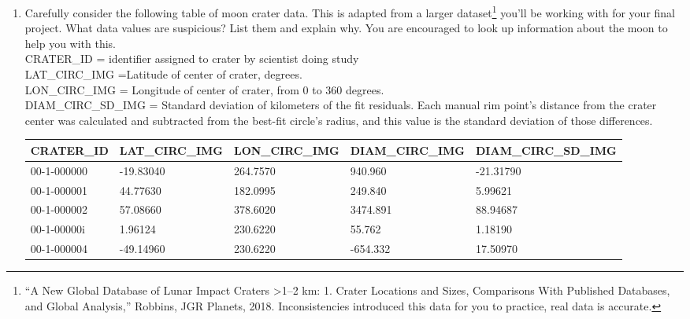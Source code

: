 \documentclass[Assignment5_Solutions]{subfiles}
\begin{document}

\begin{enumerate}[resume]
\item Carefully consider the following table of moon crater data. This is adapted from a larger dataset\footnote{``A New Global Database of Lunar Impact Craters >1–2 km: 1. Crater Locations and Sizes, Comparisons With Published Databases, and Global Analysis,'' Robbins, JGR Planets, 2018. Inconsistencies introduced this data for you to practice, real data is accurate.} you'll be working with for your final project. What data values are suspicious? List them and explain why. You are encouraged to look up information about the moon to help you with this.\\
CRATER\_ID = identifier assigned to crater by scientist doing study\\
LAT\_CIRC\_IMG =Latitude of center of crater, degrees.\\
LON\_CIRC\_IMG = Longitude of center of crater, from 0 to 360 degrees.\\
DIAM\_CIRC\_SD\_IMG = Standard deviation of kilometers of the fit residuals. Each manual
rim point’s distance from the crater center was calculated and subtracted from the best-fit circle's radius, and this value is the standard deviation of those differences.\\

\begin{center}
    \begin{tabular}{| l | l | l | l | l |}
    \hline
    CRATER\_ID & LAT\_CIRC\_IMG  & LON\_CIRC\_IMG & DIAM\_CIRC\_IMG & DIAM\_CIRC\_SD\_IMG    \\ \hline
    00-1-000000 &  -19.83040           &  264.7570             & 940.960                & -21.31790  \\ \hline
    00-1-000001 & 44.77630             &     182.0995          & 249.840                & 5.99621      \\ \hline
    00-1-000002 & 57.08660             & 378.6020              & 3474.891	           & 88.94687 \\ \hline
    00-1-00000i & 1.96124              & 230.6220               & 55.762            & 1.18190 \\ \hline
    00-1-000004 & -49.14960           & 230.6220               &-654.332          & 17.50970 \\ \hline
    \end{tabular}
\end{center}
\end{enumerate}
\end{document}
